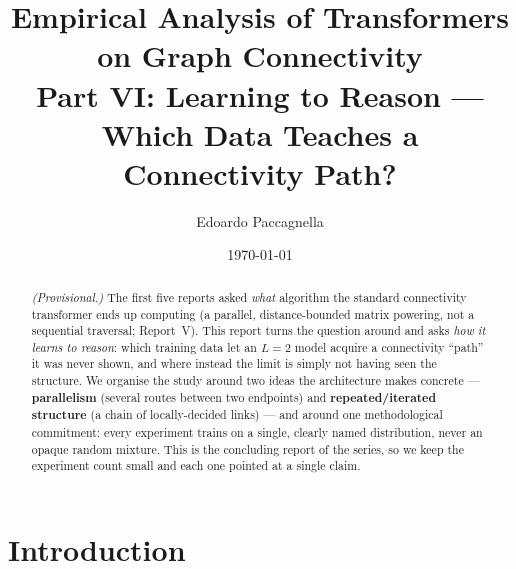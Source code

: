 \documentclass[11pt,a4paper]{article}
\title{Empirical Analysis of Transformers on Graph Connectivity \\
       \large Part VI: Learning to Reason --- Which Data Teaches a Connectivity Path?}
\author{Edoardo Paccagnella}
\date{\today}
\begin{document}
\maketitle

%

\begin{abstract}
\noindent \emph{(Provisional.)} The first five reports asked \emph{what} algorithm the standard
connectivity transformer ends up computing (a parallel, distance-bounded matrix powering, not a
sequential traversal; Report~V). This report turns the question around and asks \emph{how it learns
to reason}: which training data let an $L=2$ model acquire a connectivity ``path'' it was never
shown, and where instead the limit is simply not having seen the structure. We organise the study
around two ideas the architecture makes concrete --- \textbf{parallelism} (several routes between
two endpoints) and \textbf{repeated/iterated structure} (a chain of locally-decided links) --- and
around one methodological commitment: every experiment trains on a single, clearly named
distribution, never an opaque random mixture. This is the concluding report of the series, so we
keep the experiment count small and each one pointed at a single claim.
\end{abstract}

\section{Introduction}
\label{sec:intro}
\end{document}
